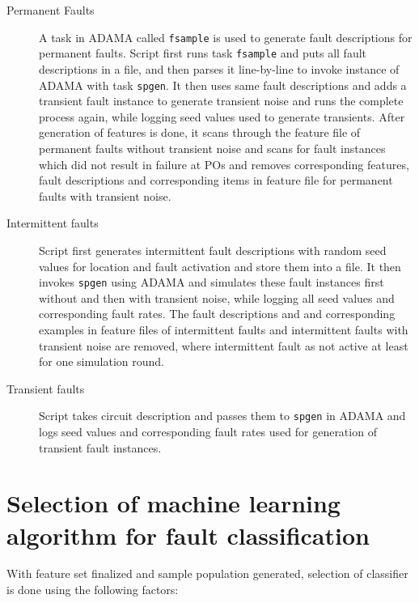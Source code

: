 \begin{description}
  \item[Permanent Faults] A task in ADAMA called \texttt{fsample} is used to generate fault descriptions for permanent faults. Script first runs task \texttt{fsample} and puts all fault descriptions in a file, and then parses it line-by-line to invoke instance of ADAMA with task \texttt{spgen}. It then uses same fault descriptions and adds a transient fault instance to generate transient noise and runs the complete process again, while logging seed values used to generate transients. After generation of features is done, it scans through the feature file of permanent faults without transient noise and scans for fault instances which did not result in failure at POs and removes corresponding features, fault descriptions and corresponding items in feature file for permanent faults with transient noise.

  \item[Intermittent faults] Script first generates intermittent fault descriptions with random seed values for location and fault activation and store them into a file. It then invokes \texttt{spgen} using ADAMA and simulates these fault instances first without and then with transient noise, while logging all seed values and corresponding fault rates. The fault descriptions and and corresponding examples in feature files of intermittent faults and intermittent faults with transient noise are removed, where intermittent fault as not active at least for one simulation round.

  \item[Transient faults] Script takes circuit description and passes them to \texttt{spgen} in ADAMA and logs seed values and corresponding fault rates used for generation of transient fault instances.
\end{description}

\section{Selection of machine learning algorithm for fault classification}
\label{sec:selml}

With feature set finalized and sample population generated, selection of classifier is done using the following factors:

